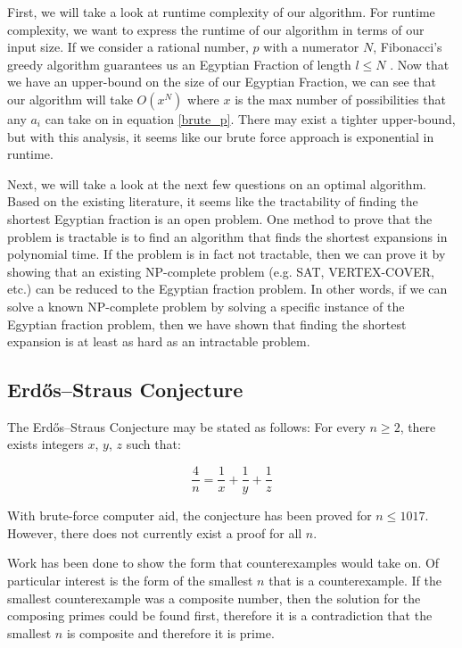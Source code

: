 \documentclass[paper=a4, fontsize=11pt]{scrartcl}
\numberwithin{equation}{section}	 %
\numberwithin{figure}{section}	 %
\numberwithin{table}{section}	 %
\begin{document}
First, we will take a look at runtime complexity of our algorithm. For runtime complexity, we want to express the runtime of our algorithm in terms of our input size. If we consider a rational number, $p$ with a numerator $N$, Fibonacci’s greedy algorithm guarantees us an Egyptian Fraction of length $l \leq N$ \cite{graham}. Now that we have an upper-bound on the size of our Egyptian Fraction, we can see that our algorithm will take $O(x^N)$ where $x$ is the max number of possibilities that any $a_i$ can take on in equation \ref{brute_p}. There may exist a tighter upper-bound, but with this analysis, it seems like our brute force approach is exponential in runtime.

Next, we will take a look at the next few questions on an optimal algorithm. Based on the existing literature, it seems like the tractability of finding the shortest Egyptian fraction is an open problem. One method to prove that the problem is tractable is to find an algorithm that finds the shortest expansions in polynomial time. If the problem is in fact not tractable, then we can prove it by showing that an existing NP-complete problem (e.g. \textsc{SAT}, \textsc{VERTEX-COVER}, etc.) can be reduced to the Egyptian fraction problem. In other words, if we can solve a known NP-complete problem by solving a specific instance of the Egyptian fraction problem, then we have shown that finding the shortest expansion is at least as hard as an intractable problem.

\subsection{Erd\H{o}s–Straus Conjecture}
The Erd\H{o}s–Straus Conjecture may be stated as follows:
For every $n \geq 2$, there exists integers $x$, $y$, $z$ such that:

\begin{equation}\label{erdos}
	\frac{4}{n} = \frac{1}{x} + \frac{1}{y} + \frac{1}{z}
\end{equation}

With brute-force computer aid, the conjecture has been proved for $n \leq 1017$. However, there does not currently exist a proof for all $n$.

Work has been done to show the form that counterexamples would take on. Of particular interest is the form of the smallest $n$ that is a counterexample. If the smallest counterexample was a composite number, then the solution for the composing primes could be found first, therefore it is a contradiction that the smallest $n$ is composite and therefore it is prime.
\end{document}
